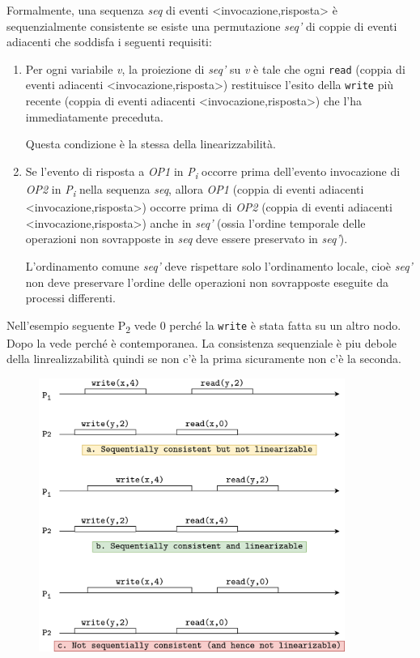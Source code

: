 \vspace{5mm}

Formalmente, una sequenza \textit{seq} di eventi <invocazione,risposta> è sequenzialmente consistente se esiste una permutazione \textit{seq'} di coppie di eventi adiacenti che soddisfa i seguenti requisiti:
\begin{enumerate}
    \item Per ogni variabile \textit{v}, la proiezione di \textit{seq'} su \textit{v} è tale che ogni \texttt{read} (coppia di eventi adiacenti <invocazione,risposta>) restituisce l'esito della \texttt{write} più recente (coppia di eventi adiacenti <invocazione,risposta>) che l'ha immediatamente preceduta.
    
    Questa condizione è la stessa della linearizzabilità.
    \item Se l'evento di risposta a \textit{OP1} in \textit{P\textsubscript{i}} occorre prima dell'evento invocazione di \textit{OP2} in \textit{P\textsubscript{i}} nella sequenza \textit{seq}, allora \textit{OP1} (coppia di eventi adiacenti <invocazione,risposta>) occorre prima di \textit{OP2} (coppia di eventi adiacenti <invocazione,risposta>) anche in \textit{seq'} (ossia l'ordine temporale delle operazioni non sovrapposte in \textit{seq} deve essere preservato in \textit{seq'}).
    
    L'ordinamento comune \textit{seq'} deve rispettare solo l'ordinamento locale, cioè \textit{seq'} non deve preservare l'ordine delle operazioni non sovrapposte eseguite da processi differenti.
\end{enumerate}
Nell’esempio seguente P\textsubscript{2} vede 0 perché la \texttt{write} è stata fatta su un altro nodo. Dopo la vede perché è contemporanea. La consistenza sequenziale è piu debole della linrealizzabilità quindi se non c’è la prima sicuramente non c’è la seconda.
\clearpage

\begin{figure}[t]
    \centering
    \includegraphics[width=10cm]{./Images/cap2/2.24.png}
\end{figure}

